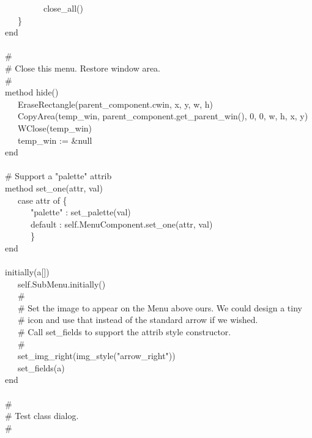 {\>   \ \ \ \ \ \ \ \ \ close\_all() \\
\>   \ \ \ \} \\
\>   end \\
\ \\
\>   \# \\
\>   \# Close this menu. Restore window area. \\
\>   \# \\
\>   method hide() \\
\>   \ \ \ EraseRectangle(parent\_component.cwin, x, y, w, h) \\
\>   \ \ \ CopyArea(temp\_win, parent\_component.get\_parent\_win(),
                    0, 0, w, h, x, y) \\
\>   \ \ \ WClose(temp\_win) \\
\>   \ \ \ temp\_win := \&null \\
\>   end \\
\ \\
\>   \# Support a "palette" attrib \\
\>   method set\_one(attr, val) \\
\>   \ \ \ case attr of \{ \\
\>   \ \ \ \ \ \ "palette" :
set\_palette(val) \\
\>   \ \ \ \ \ \ default : self.MenuComponent.set\_one(attr, val) \\
\>   \ \ \ \ \ \ \} \\
\>   end \\
\ \\
\>   initially(a[]) \\
\>   \ \ \ self.SubMenu.initially() \\
\>   \ \ \ \# \\
\>   \ \ \ \# Set the image to appear on the Menu above ours. We could design a tiny \\
\>   \ \ \ \# icon and use that instead of the standard arrow if we wished. \\
\>   \ \ \ \# Call set\_fields to support the attrib style constructor. \\
\>   \ \ \ \#  \\
\>   \ \ \ set\_img\_right(img\_style("arrow\_right")) \\
\>   \ \ \ set\_fields(a) \\
end \\
\ \\
\# \\
\# Test class dialog. \\
\# \\
}
